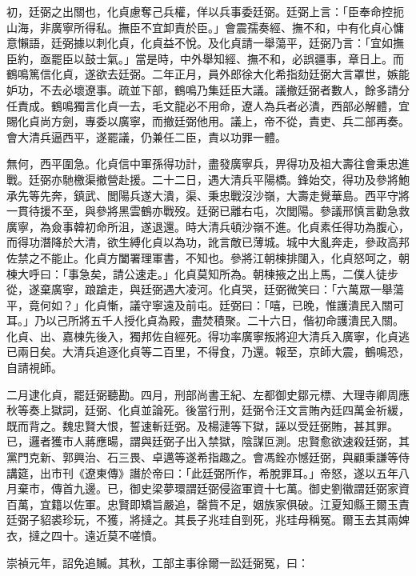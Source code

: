 \begin{pinyinscope}
初，廷弼之出關也，化貞慮奪己兵權，佯以兵事委廷弼。廷弼上言：「臣奉命控扼山海，非廣寧所得私。撫臣不宜卸責於臣。」會震孺奏經、撫不和，中有化貞心慵意懶語，廷弼據以刺化貞，化貞益不悅。及化貞請一舉蕩平，廷弼乃言：「宜如撫臣約，亟罷臣以鼓士氣。」當是時，中外舉知經、撫不和，必誤疆事，章日上。而鶴鳴篤信化貞，遂欲去廷弼。二年正月，員外郎徐大化希指劾廷弼大言罩世，嫉能妒功，不去必壞遼事。疏並下部，鶴鳴乃集廷臣大議。議撤廷弼者數人，餘多請分任責成。鶴鳴獨言化貞一去，毛文龍必不用命，遼人為兵者必潰，西部必解體，宜賜化貞尚方劍，專委以廣寧，而撤廷弼他用。議上，帝不從，責吏、兵二部再奏。會大清兵逼西平，遂罷議，仍兼任二臣，責以功罪一體。

無何，西平圍急。化貞信中軍孫得功計，盡發廣寧兵，畀得功及祖大壽往會秉忠進戰。廷弼亦馳檄渠撤營赴援。二十二日，遇大清兵平陽橋。鋒始交，得功及參將鮑承先等先奔，鎮武、閭陽兵遂大潰，渠、秉忠戰沒沙嶺，大壽走覺華島。西平守將一貫待援不至，與參將黑雲鶴亦戰歿。廷弼已離右屯，次閭陽。參議邢慎言勸急救廣寧，為僉事韓初命所沮，遂退還。時大清兵頓沙嶺不進。化貞素任得功為腹心，而得功潛降於大清，欲生縛化貞以為功，訛言敵已薄城。城中大亂奔走，參政高邦佐禁之不能止。化貞方闔署理軍書，不知也。參將江朝棟排闥入，化貞怒呵之，朝棟大呼曰：「事急矣，請公速走。」化貞莫知所為。朝棟掖之出上馬，二僕人徒步從，遂棄廣寧，踉蹌走，與廷弼遇大凌河。化貞哭，廷弼微笑曰：「六萬眾一舉蕩平，竟何如？」化貞慚，議守寧遠及前屯。廷弼曰：「嘻，已晚，惟護潰民入關可耳。」乃以己所將五千人授化貞為殿，盡焚積聚。二十六日，偕初命護潰民入關。化貞、出、嘉棟先後入，獨邦佐自經死。得功率廣寧叛將迎大清兵入廣寧，化貞逃已兩日矣。大清兵追逐化貞等二百里，不得食，乃還。報至，京師大震，鶴鳴恐，自請視師。

二月逮化貞，罷廷弼聽勘。四月，刑部尚書王紀、左都御史鄒元標、大理寺卿周應秋等奏上獄詞，廷弼、化貞並論死。後當行刑，廷弼令汪文言賄內廷四萬金祈緩，既而背之。魏忠賢大恨，誓速斬廷弼。及楊漣等下獄，誣以受廷弼賄，甚其罪。已，邏者獲市人蔣應暘，謂與廷弼子出入禁獄，陰謀叵測。忠賢愈欲速殺廷弼，其黨門克新、郭興治、石三畏、卓邁等遂希指趣之。會馮銓亦憾廷弼，與顧秉謙等侍講筵，出市刊《遼東傳》譖於帝曰：「此廷弼所作，希脫罪耳。」帝怒，遂以五年八月棄市，傳首九邊。已，御史梁夢環謂廷弼侵盜軍資十七萬。御史劉徽謂廷弼家資百萬，宜籍以佐軍。忠賢即矯旨嚴追，罄貲不足，姻族家俱破。江夏知縣王爾玉責廷弼子貂裘珍玩，不獲，將撻之。其長子兆珪自剄死，兆珪母稱冤。爾玉去其兩婢衣，撻之四十。遠近莫不嗟憤。

崇禎元年，詔免追贓。其秋，工部主事徐爾一訟廷弼冤，曰：


\end{pinyinscope}
